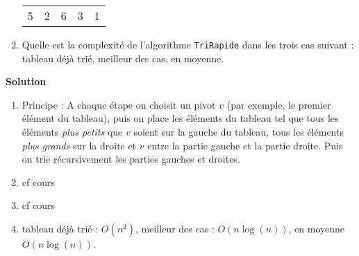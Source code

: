 \begin{exercice}
\begin{enumerate}
\begin{tabular}{ccccc}
5 & 2 & 6 & 3 & 1
\end{tabular}

\item Quelle est la complexité de l'algorithme {\tt TriRapide} dans les trois cas suivant : tableau déjà trié, meilleur des cas, en moyenne.
\end{enumerate}

\textbf{Solution}

\begin{enumerate}
\item Principe : A chaque étape on choisit un pivot $v$ (par exemple, le premier élément du tableau), puis on place les éléments du tableau tel que tous les éléments \emph{plus petits} que $v$ soient sur la gauche du tableau, tous les éléments \emph{plus grands} sur la droite et $v$ entre la partie gauche et la partie droite. Puis on trie récursivement les parties gauches et droites.

\item cf cours
\item cf cours
\item tableau déjà trié : $O(n^2)$, meilleur des cas : $O(n \log(n))$, en moyenne $O(n \log(n))$.
\end{enumerate}

\end{exercice}